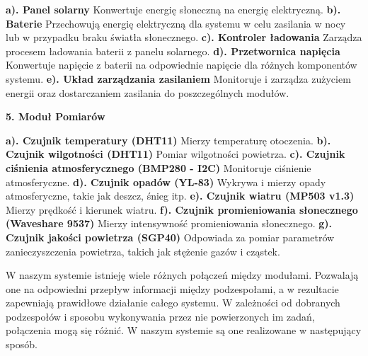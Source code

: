 \documentclass{article}
\begin{document}
\begin{flushleft}
    \textbf{a). Panel solarny} Konwertuje energię słoneczną na energię elektryczną. \newline
    \textbf{b). Baterie} Przechowują energię elektryczną dla systemu w celu zasilania w nocy lub w przypadku braku światła słonecznego. \newline
    \textbf{c). Kontroler ładowania} Zarządza procesem ładowania baterii z panelu solarnego. \newline
    \textbf{d). Przetwornica napięcia} Konwertuje napięcie z baterii na odpowiednie napięcie dla różnych komponentów systemu. \newline
    \textbf{e). Układ zarządzania zasilaniem} Monitoruje i zarządza zużyciem energii oraz dostarczaniem zasilania do poszczególnych modułów. \newline
\end{flushleft}
\large
\begin{center}
    \textbf{5. Moduł Pomiarów} 
\end{center}
\begin{flushleft}
    \textbf{a). Czujnik temperatury (DHT11)} Mierzy temperaturę otoczenia. \newline
    \textbf{b). Czujnik wilgotności (DHT11)} Pomiar wilgotności powietrza. \newline
    \textbf{c). Czujnik ciśnienia atmosferycznego (BMP280 - I2C)} Monitoruje ciśnienie atmosferyczne. \newline
    \textbf{d). Czujnik opadów (YL-83)} Wykrywa i mierzy opady atmosferyczne, takie jak deszcz, śnieg itp. \newline
    \textbf{e). Czujnik wiatru (MP503 v1.3)} Mierzy prędkość i kierunek wiatru. \newline
    \textbf{f). Czujnik promieniowania słonecznego (Waveshare 9537)} Mierzy intensywność promieniowania słonecznego. \newline
    \textbf{g). Czujnik jakości powietrza (SGP40)} Odpowiada za pomiar parametrów zanieczyszczenia powietrza, takich jak stężenie gazów i cząstek. \newline
\end{flushleft}
\newpage
\begin{center}
    \large W naszym systemie istnieję wiele różnych połączeń między modułami. Pozwalają one na odpowiedni przepływ informacji między podzespołami, a w rezultacie zapewniają prawidłowe działanie całego systemu.
    W zależności od dobranych podzespołów i sposobu wykonywania przez nie powierzonych im zadań, połączenia mogą się różnić. W naszym systemie są one realizowane w następujący sposób.
\end{center}
\end{document}
